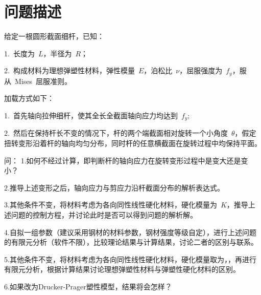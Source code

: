 \chapter{问题描述}
\label{cha:Description}
给定一根圆形截面细杆，已知： 

1.~长度为~{$L$}，半径为~{$R$}； 

2.~构成材料为理想弹塑性材料，弹性模量~{$E$}，泊松比~{$\nu$}，屈服强度为~{$f_y$}，服从~Mises~屈服准则。 

加载方式如下： 

1.~首先轴向拉伸细杆，使其全长全截面轴向应力均达到~{$f_y$}; 

2.~然后在保持杆长不变的情况下，杆的两个端截面相对旋转一个小角度~{$\theta$}，假定扭转变形沿着杆的轴向均匀分布，同时杆的任意横截面在旋转过程中均保持平面。 

问： 
1.如何不经过计算，即判断杆的轴向应力在旋转变形过程中是变大还是变小？ 

2.推导上述变形之后，轴向应力与剪应力沿杆截面分布的解析表达式。

3.其他条件不变，将材料考虑为各向同性线性硬化材料，硬化模量为~{$K$}，推导上述问题的控制方程，并讨论此时是否可以得到问题的解析解。

4.自拟一组参数（建议采用钢材的材料参数，钢材强度等级自定），进行上述问题的有限元分析（软件不限），比较理论结果与计算结果，讨论二者的区别与联系。 

5.其他条件不变，将材料考虑为各向同性线性硬化材料，硬化模量取为，，再进行有限元分析，根据计算结果讨论理想弹塑性材料与弹塑性硬化材料的区别。 

6.如果改为Drucker-Prager塑性模型，结果将会怎样？ 
